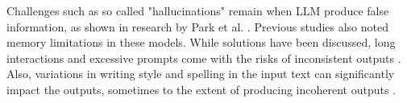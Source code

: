 Challenges such as so called "hallucinations" remain when LLM produce false information, as shown in research by Park et al. \cite{1park2023generative}.
Previous studies also noted memory limitations in these models. While solutions have been discussed, long interactions and excessive prompts come with the risks of inconsistent outputs \cite{zhong2024memorybank}. Also, variations in writing style and spelling in the input text can significantly impact the outputs, sometimes to the extent of producing incoherent outputs \cite{SolidGold}.